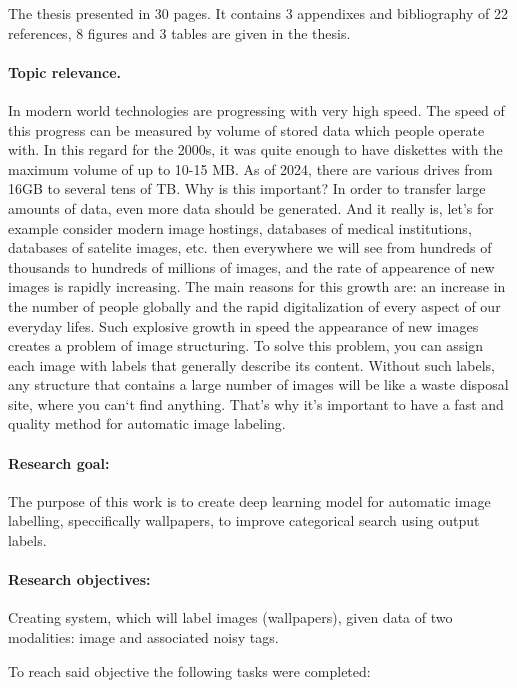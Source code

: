 \documentclass{udstu}
\begin{document}
\abstractEng

The thesis presented in 30 pages.
It contains 3 appendixes and bibliography of 22 references,
8 figures and 3 tables are given in the thesis.

\paragraph{\textbf{Topic relevance.}}
In modern world technologies are progressing with very high speed. The speed of this progress can be
measured by volume of stored data which people operate with. In this regard for the 2000s, it was
quite enough to have diskettes with the maximum volume of up to 10-15 MB. As of 2024, there are various
drives from 16GB to several tens of TB. Why is this important? In order to transfer large amounts of data,
even more data should be generated. And it really is, let's for example consider modern image hostings,
databases of medical institutions, databases of satelite images, etc. then everywhere we will see
from hundreds of thousands to hundreds of millions of images, and the rate of appearence of new images
is rapidly increasing. The main reasons for this growth are: an increase in the number of people globally and
the rapid digitalization of every aspect of our everyday lifes.
Such explosive growth in speed the appearance of new images creates a problem of image structuring.
To solve this problem, you can assign each image with labels that generally describe its content.
Without such labels, any structure that contains a large number of images will be like
a waste disposal site, where you can`t find anything.
That's why it's important to have a fast and quality method for automatic image labeling.

\paragraph{\textbf{Research goal:}}
The purpose of this work is to create deep learning model for automatic image labelling,
speccifically wallpapers, to improve categorical search using output labels.

\paragraph{\textbf{Research objectives:}}
Creating system, which will label images (wallpapers), given data of two modalities:
image and associated noisy tags.

To reach said objective the following tasks were completed:
\end{document}
